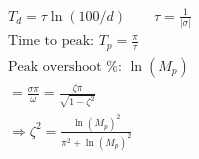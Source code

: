         \begin{minipage}{0.49\linewidth}
            \begin{align*}
                T_d = \tau \ln(100/d) \quad \quad \tau = \frac{1}{|\sigma|}\\
                \text{Time to peak: } T_p = \frac{\pi}{\tau}\\
                \text{Peak overshoot \%: } \ln(M_p)\\ 
                = \frac{\sigma \pi}{\omega} = \frac{\zeta \pi}{\sqrt{1 - \zeta^2}}\\
                \Rightarrow \zeta^2 = \frac{\ln(M_p)^2}{\pi^2 + \ln(M_p)^2}\\
            \end{align*}
        \end{minipage}
        
        